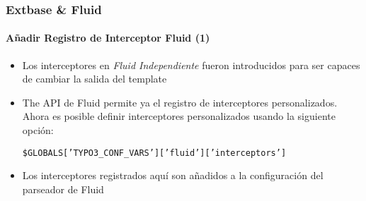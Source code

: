 \begin{frame}[fragile]
	\frametitle{Extbase \& Fluid}
	\framesubtitle{Añadir Registro de Interceptor Fluid (1)}

	\lstset{basicstyle=\tiny\ttfamily}

	\begin{itemize}

		\item Los interceptores en \textit{Fluid Independiente} fueron introducidos para ser capaces de cambiar la salida del template

		\item The API de Fluid permite ya el registro de interceptores personalizados.
			Ahora es posible definir interceptores personalizados usando la siguiente opción:

			\small
				\texttt{\$GLOBALS['TYPO3\_CONF\_VARS']['fluid']['interceptors']}
			\normalsize

		\item Los interceptores registrados aquí son añadidos a la configuración del parseador de Fluid

	\end{itemize}

\end{frame}

